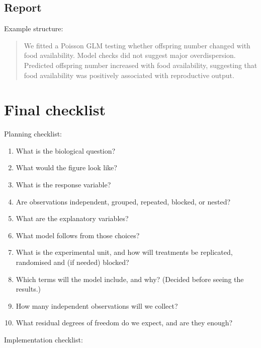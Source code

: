 \documentclass[
  letterpaper,
  8pt,
  a4paper]{book}
\providecommand{\tightlist}{%
  \setlength{\itemsep}{0pt}\setlength{\parskip}{0pt}}
\begin{document}
\subsection*{Report}\label{report-2}

Example structure:

\begin{quote}
We fitted a Poisson GLM testing whether offspring number changed with
food availability. Model checks did not suggest major overdispersion.
Predicted offspring number increased with food availability, suggesting
that food availability was positively associated with reproductive
output.
\end{quote}

\section*{Final checklist}\label{final-checklist}


Planning checklist:

\begin{enumerate}
\def\labelenumi{\arabic{enumi}.}
\tightlist
\item
  What is the biological question?
\item
  What would the figure look like?
\item
  What is the response variable?
\item
  Are observations independent, grouped, repeated, blocked, or nested?
\item
  What are the explanatory variables?
\item
  What model follows from those choices?
\item
  What is the experimental unit, and how will treatments be replicated,
  randomised and (if needed) blocked?
\item
  Which terms will the model include, and why? (Decided before seeing
  the results.)
\item
  How many independent observations will we collect?
\item
  What residual degrees of freedom do we expect, and are they enough?
\end{enumerate}

Implementation checklist:
\end{document}
